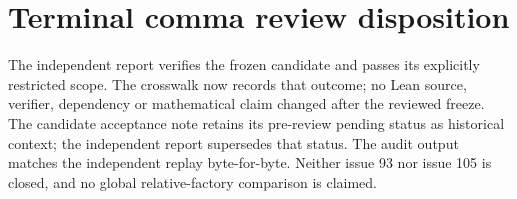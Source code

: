 \documentclass{article}
\begin{document}
\section*{Terminal comma review disposition}
The independent report verifies the frozen candidate and passes its explicitly restricted scope. The crosswalk now records that outcome; no Lean source, verifier, dependency or mathematical claim changed after the reviewed freeze. The candidate acceptance note retains its pre-review pending status as historical context; the independent report supersedes that status. The audit output matches the independent replay byte-for-byte. Neither issue 93 nor issue 105 is closed, and no global relative-factory comparison is claimed.
\end{document}
